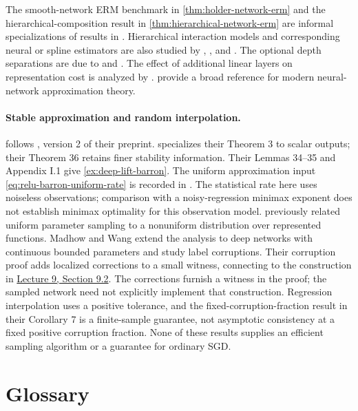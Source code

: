 \documentclass[11pt,twoside]{article}
\theoremstyle{definition}
\theoremstyle{remark}
\begin{document}
The smooth-network ERM benchmark in \cref{thm:holder-network-erm} and the
hierarchical-composition result in \cref{thm:hierarchical-network-erm} are
informal specializations of results in \citet{schmidthieber2020}.
Hierarchical interaction models and corresponding neural or spline estimators
are also studied by \citet{kohler2017}, \citet{bauer2019}, and
\citet{kohlerlanger2021}. The optional depth separations are due to
\citet{telgarsky2016} and \citet{eldan2016}. The effect of additional linear
layers on representation cost is analyzed by \citet{parkinson2025}.
\citet{petersen2026} provide a broad reference for modern neural-network
approximation theory.

\paragraph{Stable approximation and random interpolation.}
 follows \citet{madhowwang2026}, version 2 of their
preprint.  specializes their Theorem 3
to scalar outputs; their Theorem 36 retains finer stability information.
Their Lemmas 34--35 and Appendix I.1 give
\cref{ex:deep-lift-barron}. The uniform approximation input
\cref{eq:relu-barron-uniform-rate} is recorded in
\citet[Lemma 2.3]{yangzhou2025}. The statistical rate here uses noiseless
observations; comparison with a noisy-regression minimax exponent does not
establish minimax optimality for this observation model.
\citet{buzaglo2024} previously related uniform parameter sampling to a
nonuniform distribution over represented functions. Madhow and Wang extend
the analysis to deep networks with continuous bounded parameters and study
label corruptions. Their corruption proof adds localized corrections to a
small witness, connecting to the construction in
\href{lecture09.pdf\#nameddest=section.2}{Lecture 9, Section 9.2}.
The corrections furnish a witness in the proof; the sampled network need
not explicitly implement that construction. Regression interpolation uses
a positive tolerance, and the fixed-corruption-fraction result in their
Corollary 7 is a finite-sample guarantee, not asymptotic consistency at a
fixed positive corruption fraction. None of these results supplies an
efficient sampling algorithm or a guarantee for ordinary SGD.
\section*{Glossary}
\end{document}
